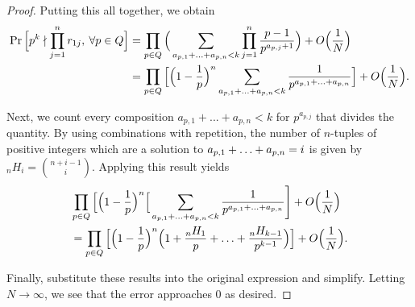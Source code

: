 \documentclass[12pt]{amsart}
\theoremstyle{definition}
\begin{document}
\begin{proof}
	Putting this all together, we obtain
	\begin{align*}
	\Pr\Big[p^k\nmid \prod_{j=1}^{n}r_{1j},\: \forall p\in Q\Big] &= \prod_{p\in Q} \Big(\sum_{a_{p,1}+\mathellipsis+a_{p,n}<k}\prod_{j=1}^{n}\frac{p-1}{p^{a_{p,j}+1}}\Big)+O\Big(\frac{1}{N}\Big)\\
		&=\prod_{p\in Q}\Big[\Big(1-\frac{1}{p}\Big)^n\sum_{a_{p,1}+\mathellipsis+a_{p,n}<k}\frac{1}{p^{a_{p,1}+\mathellipsis+a_{p,n}}}\Big]+O\Big(\frac{1}{N}\Big).
	\end{align*}

	Next, we count every composition $a_{p,1}+ ... +a_{p,n}<k$ for $p^{a_{p,j}}$ that divides the quantity. By using combinations with repetition, the number of $n$-tuples of positive integers which are a solution to \(a_{p,1}+\mathellipsis+a_{p,n}=i\) is given by $_nH_i = \binom{n+i-1}{i}$. Applying this result yields
	\begin{align*}
		&\prod_{p\in Q}\Big[\Big(1-\frac{1}{p}\Big)^n\Big[\sum_{a_{p,1}+\mathellipsis+a_{p,n}<k}\frac{1}{p^{a_{p,1}+\mathellipsis+a_{p,n}}}\Biggr]+O\Big(\frac{1}{N}\Big)\\
		&= \prod_{p\in Q}\Big[\Big(1-\frac{1}{p}\Big)^n\Big(1+\frac{_nH_1}{p}+\mathellipsis+\frac{_nH_{k-1}}{p^{k-1}}\Big)\Big]+O\Big(\frac{1}{N}\Big).
	\end{align*}
	
	Finally, substitute these results into the original expression and simplify. Letting $N\to \infty$, we see that the error approaches 0 as desired.
\end{proof}


\newpage
\end{document}
